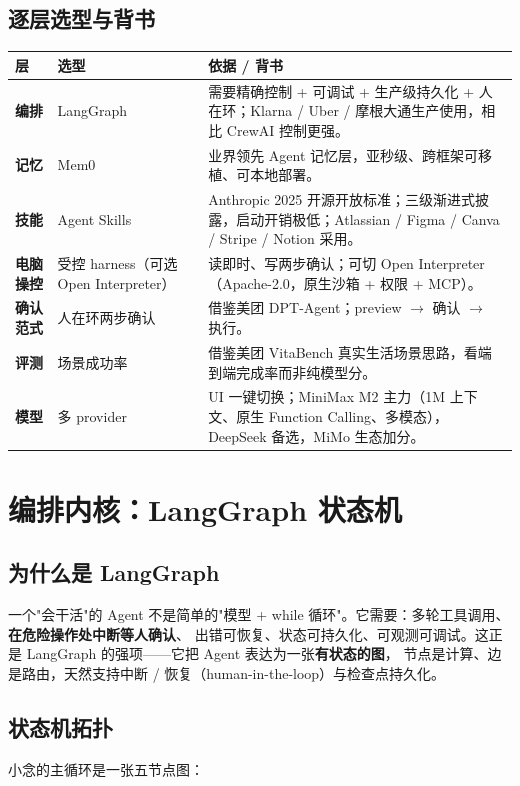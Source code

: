 \section{逐层选型与背书}
\begin{center}
\footnotesize
\begin{tabularx}{\linewidth}{>{\bfseries}p{1.9cm} p{3.1cm} X}
\toprule
层 & 选型 & 依据 / 背书 \\
\midrule
编排 & LangGraph & 需要精确控制 + 可调试 + 生产级持久化 + 人在环；Klarna / Uber / 摩根大通生产使用，相比 CrewAI 控制更强。 \\
记忆 & Mem0 & 业界领先 Agent 记忆层，亚秒级、跨框架可移植、可本地部署。 \\
技能 & Agent Skills & Anthropic 2025 开源开放标准；三级渐进式披露，启动开销极低；Atlassian / Figma / Canva / Stripe / Notion 采用。 \\
电脑操控 & 受控 harness（可选 Open Interpreter） & 读即时、写两步确认；可切 Open Interpreter（Apache-2.0，原生沙箱 + 权限 + MCP）。 \\
确认范式 & 人在环两步确认 & 借鉴美团 DPT-Agent；preview $\to$ 确认 $\to$ 执行。 \\
评测 & 场景成功率 & 借鉴美团 VitaBench 真实生活场景思路，看端到端完成率而非纯模型分。 \\
模型 & 多 provider & UI 一键切换；MiniMax M2 主力（1M 上下文、原生 Function Calling、多模态），DeepSeek 备选，MiMo 生态加分。 \\
\bottomrule
\end{tabularx}
\end{center}


\chapter{编排内核：LangGraph 状态机}

\section{为什么是 LangGraph}
一个"会干活"的 Agent 不是简单的"模型 + while 循环"。它需要：多轮工具调用、\textbf{在危险操作处中断等人确认}、
出错可恢复、状态可持久化、可观测可调试。这正是 LangGraph 的强项——它把 Agent 表达为一张\textbf{有状态的图}，
节点是计算、边是路由，天然支持中断 / 恢复（human-in-the-loop）与检查点持久化。

\section{状态机拓扑}
小念的主循环是一张五节点图：

